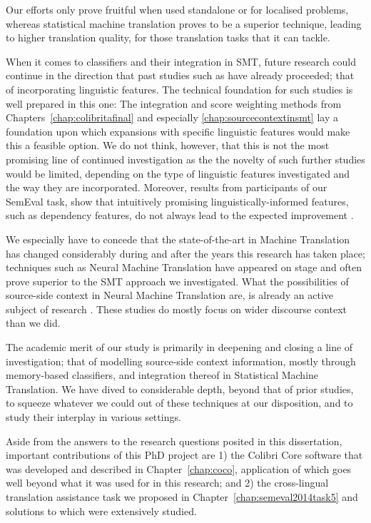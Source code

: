 Our efforts only prove fruitful when used standalone or for localised problems,
whereas statistical machine translation proves to be a superior technique,
leading to higher translation quality, for those translation tasks that it can
tackle.

When it comes to classifiers and their integration in SMT, future research could continue in the direction that
past studies such as \cite{Rejwanul+11} have already proceeded; that of incorporating linguistic
features. The technical foundation for such studies is well prepared in this one: The integration and score weighting methods from Chapters~\ref{chap:colibritafinal} and especially
\ref{chap:sourcecontextinsmt} lay a foundation upon which expansions with specific linguistic features would make this a
feasible option. We do not think, however, that this is not the most promising line of continued investigation as the
the novelty of such further studies would be limited, depending on the type of linguistic features
investigated and the way they are incorporated. Moreover, results from participants of our SemEval task, show
that intuitively promising linguistically-informed features, such as dependency features, do not always lead to the
expected improvement \citep{UNAL,IUCL}.

We especially have to concede that the state-of-the-art in Machine Translation has changed considerably during and after
the years this research has taken place; techniques such as Neural Machine Translation have appeared on stage and often
prove superior to the SMT approach we investigated. What the possibilities of source-side context in Neural Machine
Translation are, is already an active subject of research \citep{Jean+17,Wang+17,Bawden+17,Maruf+17}. These studies
do mostly focus on wider discourse context than we did.

The academic merit of our study is primarily in deepening and closing a line of investigation; that of modelling
source-side context information, mostly through memory-based classifiers, and integration thereof in Statistical Machine
Translation. We have dived to considerable depth, beyond that of prior studies, to
squeeze whatever we could out of these techniques at our disposition, and to study their interplay in various settings.

Aside from the answers to the research questions posited in this dissertation, important contributions of this PhD
project are 1) the Colibri Core software that was developed and described in Chapter~\ref{chap:coco}, application of
which goes well beyond what it was used for in this research; and 2) the cross-lingual translation assistance task we
proposed in Chapter~\ref{chap:semeval2014task5} and solutions to which were extensively studied.



